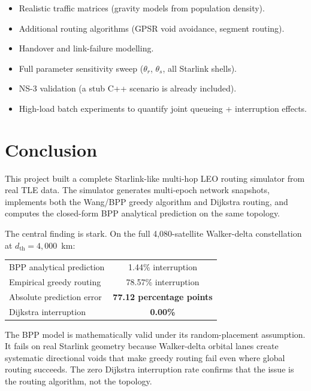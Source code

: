 \documentclass[12pt,a4paper]{report}
\newcommand{\dth}{d_{\mathrm{th}}}
\newcommand{\thetar}{\theta_r}
\newcommand{\thetas}{\theta_s}
\begin{document}
\begin{itemize}[noitemsep]
  \item Realistic traffic matrices (gravity models from population density).
  \item Additional routing algorithms (GPSR void avoidance, segment routing).
  \item Handover and link-failure modelling.
  \item Full parameter sensitivity sweep ($\thetar$, $\thetas$, all Starlink shells).
  \item NS-3 validation (a stub C++ scenario is already included).
  \item High-load batch experiments to quantify joint queueing + interruption effects.
\end{itemize}

\chapter{Conclusion}
\label{ch:conclusion}

This project built a complete Starlink-like multi-hop LEO routing simulator from real
TLE data. The simulator generates multi-epoch network snapshots, implements both the
Wang/BPP greedy algorithm and Dijkstra routing, and computes the closed-form BPP
analytical prediction on the same topology.

The central finding is stark. On the full 4{,}080-satellite Walker-delta constellation
at $\dth = 4{,}000$~km:

\begin{center}
\begin{tabular}{lc}
\toprule
BPP analytical prediction   & 1.44\% interruption \\
Empirical greedy routing    & 78.57\% interruption \\
Absolute prediction error   & \textbf{77.12 percentage points} \\
Dijkstra interruption       & \textbf{0.00\%} \\
\bottomrule
\end{tabular}
\end{center}

The BPP model is mathematically valid under its random-placement assumption. It fails
on real Starlink geometry because Walker-delta orbital lanes create systematic
directional voids that make greedy routing fail even where global routing succeeds.
The zero Dijkstra interruption rate confirms that the issue is the routing algorithm,
not the topology.
\end{document}
